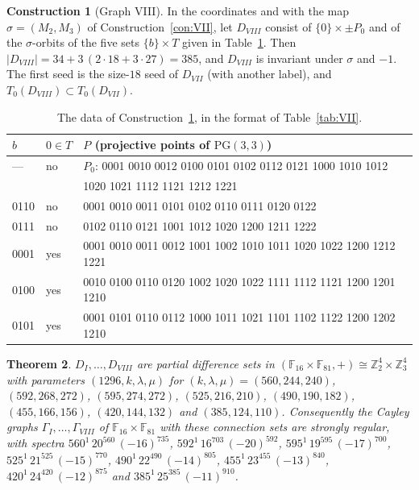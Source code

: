 \documentclass[11pt]{amsart}
\newtheorem{theorem}{Theorem}[section]
\theoremstyle{definition}
\newtheorem{construction}[theorem]{Construction}
\newcommand{\F}{\mathbb{F}}
\newcommand{\Z}{\mathbb{Z}}
\begin{document}
\begin{construction}[Graph VIII]\label{con:VIII}
In the coordinates and with the map $\sigma=(M_2,M_3)$ of Construction~\ref{con:VII}, let $D_{VIII}$ consist of $\{0\}\times\pm P_0$ and of the $\sigma$-orbits of the five sets $\{b\}\times T$ given in Table~\ref{tab:VIII}. Then $|D_{VIII}|=34+3\,(2\cdot18+3\cdot27)=385$, and $D_{VIII}$ is invariant under $\sigma$ and $-1$. The first seed is the size-$18$ seed of $D_{VII}$ (with another label), and $T_0(D_{VIII})\subset T_0(D_{VII})$.
\end{construction}

\begin{table}[ht]
\centering\small
\caption{The data of Construction~\ref{con:VIII}, in the format of Table~\ref{tab:VII}.}\label{tab:VIII}
\begin{tabular}{lll}
\toprule
$b$ & $0\in T$ & $P$ (projective points of $\mathrm{PG}(3,3)$)\\
\midrule
--- & no & $P_0$: 0001 0010 0012 0100 0101 0102 0112 0121 1000 1010 1012\\
& & \phantom{$P_0$: }1020 1021 1112 1121 1212 1221\\
0110 & no & 0001 0010 0011 0101 0102 0110 0111 0120 0122\\
0111 & no & 0102 0110 0121 1001 1012 1020 1200 1211 1222\\
0001 & yes & 0001 0010 0011 0012 1001 1002 1010 1011 1020 1022 1200 1212 1221\\
0100 & yes & 0010 0100 0110 0120 1002 1020 1022 1111 1112 1121 1200 1201 1210\\
0101 & yes & 0001 0101 0110 0112 1000 1011 1021 1101 1102 1122 1200 1202 1210\\
\bottomrule
\end{tabular}
\end{table}

\begin{theorem}\label{thm:graphs}
$D_I,\dots,D_{VIII}$ are partial difference sets in $(\F_{16}\times\F_{81},+)\cong\Z_2^4\times\Z_3^4$ with parameters $(1296,k,\lambda,\mu)$ for $(k,\lambda,\mu)=(560,244,240)$, $(592,268,272)$, $(595,274,272)$, $(525,216,210)$, $(490,190,182)$, $(455,166,156)$, $(420,144,132)$ and $(385,124,110)$. Consequently the Cayley graphs $\Gamma_I,\dots,\Gamma_{VIII}$ of $\F_{16}\times\F_{81}$ with these connection sets are strongly regular, with spectra $560^1\,20^{560}\,(-16)^{735}$, $592^1\,16^{703}\,(-20)^{592}$, $595^1\,19^{595}\,(-17)^{700}$, $525^1\,21^{525}\,(-15)^{770}$, $490^1\,22^{490}\,(-14)^{805}$, $455^1\,23^{455}\,(-13)^{840}$, $420^1\,24^{420}\,(-12)^{875}$ and $385^1\,25^{385}\,(-11)^{910}$.
\end{theorem}
\end{document}
